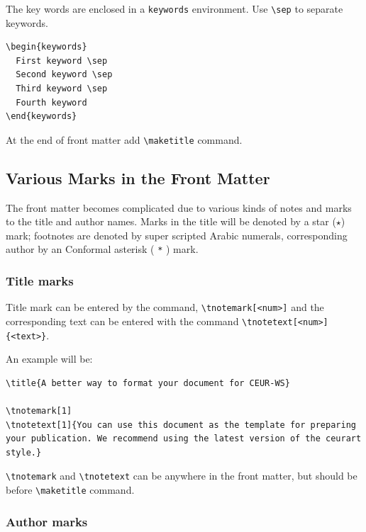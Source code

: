 \documentclass[%
twocolumn
]{ceurart}
\begin{document}
The key words are enclosed in a
\verb|keywords|
environment. Use
\verb|\sep|
 to separate keywords.

\begin{lstlisting}[language={[latex]TeX}]
\begin{keywords}
  First keyword \sep
  Second keyword \sep
  Third keyword \sep
  Fourth keyword
\end{keywords}
\end{lstlisting}

At the end of front matter add
\verb|\maketitle|
 command.

\subsection{Various Marks in the Front Matter}

The front matter becomes complicated due to various kinds of notes and marks to the title and author names.
Marks in the title will be denoted by a star ($\star$) mark; footnotes are denoted by super scripted Arabic numerals, corresponding author by an Conformal asterisk (
\verb|*|
) mark.

\subsubsection{Title marks}

Title mark can be entered by the command,
\verb|\tnotemark[<num>]|
and the corresponding text can be entered with the command
\verb|\tnotetext[<num>]{<text>}|.

An example will be:
\begin{lstlisting}[language={[latex]TeX}]
\title{A better way to format your document for CEUR-WS}

\tnotemark[1]
\tnotetext[1]{You can use this document as the template for preparing your publication. We recommend using the latest version of the ceurart style.}
\end{lstlisting}

\verb|\tnotemark|
 and
\verb|\tnotetext|
 can be anywhere in the front matter, but should be before
\verb|\maketitle|
 command.

\subsubsection{Author marks}
\end{document}

